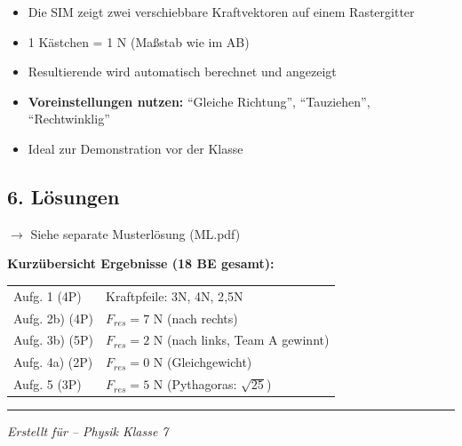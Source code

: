 \documentclass[a4paper,11pt]{article}
\begin{document}
\begin{itemize}[nosep]
\item Die SIM zeigt zwei verschiebbare Kraftvektoren auf einem Rastergitter
\item 1 Kästchen = 1 N (Maßstab wie im AB)
\item Resultierende wird automatisch berechnet und angezeigt
\item \textbf{Voreinstellungen nutzen:} ``Gleiche Richtung'', ``Tauziehen'', ``Rechtwinklig''
\item Ideal zur Demonstration vor der Klasse
\end{itemize}

\vspace{0.5cm}

\subsection*{6. Lösungen}

$\rightarrow$ Siehe separate Musterlösung (ML.pdf)

\vspace{0.3cm}

\textbf{Kurzübersicht Ergebnisse (18 BE gesamt):}

\begin{tabular}{ll}
Aufg. 1 (4P) & Kraftpfeile: 3N, 4N, 2{,}5N \\
Aufg. 2b) (4P) & $F_{res} = 7$ N (nach rechts) \\
Aufg. 3b) (5P) & $F_{res} = 2$ N (nach links, Team A gewinnt) \\
Aufg. 4a) (2P) & $F_{res} = 0$ N (Gleichgewicht) \\
Aufg. 5 (3P) & $F_{res} = 5$ N (Pythagoras: $\sqrt{25}$) \\
\end{tabular}

\vspace{0.5cm}

\hrule
\vspace{0.3cm}
\textit{Erstellt für  -- Physik Klasse 7}
\end{document}
